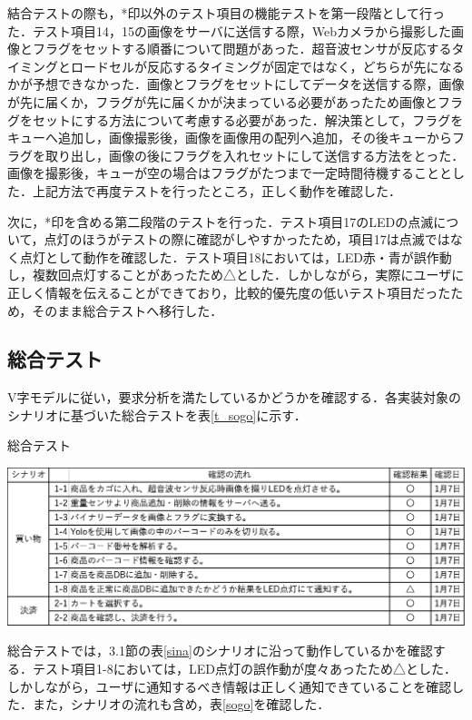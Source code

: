 結合テストの際も，*印以外のテスト項目の機能テストを第一段階として行った．テスト項目14，15の画像をサーバに送信する際，Webカメラから撮影した画像とフラグをセットする順番について問題があった．超音波センサが反応するタイミングとロードセルが反応するタイミングが固定ではなく，どちらが先になるかが予想できなかった．画像とフラグをセットにしてデータを送信する際，画像が先に届くか，フラグが先に届くかが決まっている必要があったため画像とフラグをセットにする方法について考慮する必要があった．解決策として，フラグをキューへ追加し，画像撮影後，画像を画像用の配列へ追加，その後キューからフラグを取り出し，画像の後にフラグを入れセットにして送信する方法をとった．画像を撮影後，キューが空の場合はフラグがたつまで一定時間待機することとした．上記方法で再度テストを行ったところ，正しく動作を確認した．

次に，*印を含める第二段階のテストを行った．テスト項目17のLEDの点滅について，点灯のほうがテストの際に確認がしやすかったため，項目17は点滅ではなく点灯として動作を確認した．テスト項目18においては，LED赤・青が誤作動し，複数回点灯することがあったため△とした．しかしながら，実際にユーザに正しく情報を伝えることができており，比較的優先度の低いテスト項目だったため，そのまま総合テストへ移行した．


\subsection{総合テスト}


V字モデルに従い，要求分析を満たしているかどうかを確認する．各実装対象のシナリオに基づいた総合テストを表\ref{t_sogo}に示す．


\begin{table}[htbp]
\centering
\caption{総合テスト}
\includegraphics[width = 15cm]{./picture/t_sogo.eps}
\label{t_sogo}
\end{table}

総合テストでは，3.1節の表\ref{sina}のシナリオに沿って動作しているかを確認する．テスト項目1-8においては，LED点灯の誤作動が度々あったため△とした．しかしながら，ユーザに通知するべき情報は正しく通知できていることを確認した．また，シナリオの流れも含め，表\ref{sogo}を確認した．
